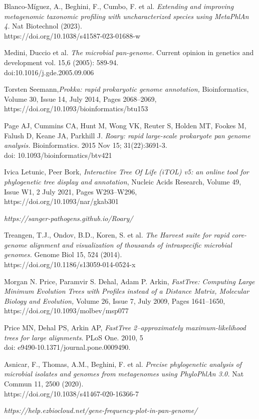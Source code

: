 \documentclass[a4paper,titlepage]{book}
\begin{document}
\begin{thebibliography}{}
Blanco-Míguez, A., Beghini, F., Cumbo, F. et al. \emph{Extending and improving metagenomic taxonomic profiling with uncharacterized species using MetaPhlAn 4.} Nat Biotechnol (2023). \\https://doi.org/10.1038/s41587-023-01688-w


Medini, Duccio et al. \emph{The microbial pan-genome.} Current opinion in genetics and development vol. 15,6 (2005): 589-94. \\doi:10.1016/j.gde.2005.09.006

Torsten Seemann,\emph{Prokka: rapid prokaryotic genome annotation,} Bioinformatics, Volume 30, Issue 14, July 2014, Pages 2068–2069,\\ https://doi.org/10.1093/bioinformatics/btu153

Page AJ, Cummins CA, Hunt M, Wong VK, Reuter S, Holden MT, Fookes M, Falush D, Keane JA, Parkhill J. \emph{Roary: rapid large-scale prokaryote pan genome analysis.} Bioinformatics. 2015 Nov 15; 31(22):3691-3. \\doi: 10.1093/bioinformatics/btv421

Ivica Letunic, Peer Bork, \emph{Interactive Tree Of Life (iTOL) v5: an online tool for phylogenetic tree display and annotation}, Nucleic Acids Research, Volume 49, Issue W1, 2 July 2021, Pages W293–W296, \\https://doi.org/10.1093/nar/gkab301

\emph{https://sanger-pathogens.github.io/Roary/}

Treangen, T.J., Ondov, B.D., Koren, S. et al. \emph{The Harvest suite for rapid core-genome alignment and visualization of thousands of intraspecific microbial genomes.} Genome Biol 15, 524 (2014).\\https://doi.org/10.1186/s13059-014-0524-x

Morgan N. Price, Paramvir S. Dehal, Adam P. Arkin, \emph{FastTree: Computing Large Minimum Evolution Trees with Profiles instead of a Distance Matrix, Molecular Biology and Evolution,} Volume 26, Issue 7, July 2009, Pages 1641–1650, \\https://doi.org/10.1093/molbev/msp077


Price MN, Dehal PS, Arkin AP, \emph{FastTree 2–approximately maximum-likelihood trees for large alignments}. PLoS One. 2010, 5\\doi: e9490-10.1371/journal.pone.0009490.


Asnicar, F., Thomas, A.M., Beghini, F. et al.
\emph{Precise phylogenetic analysis of microbial isolates and genomes from metagenomes using PhyloPhlAn 3.0.} Nat Commun 11, 2500 (2020).\\ https://doi.org/10.1038/s41467-020-16366-7


\emph{https://help.ezbiocloud.net/gene-frequency-plot-in-pan-genome/}


\end{thebibliography}
\end{document}
